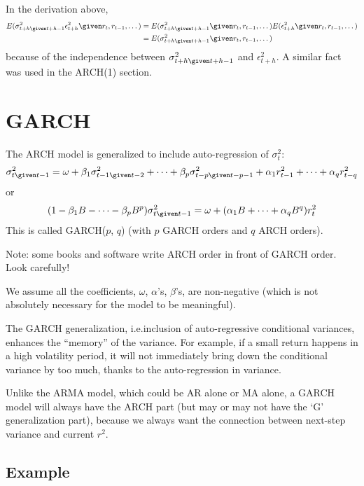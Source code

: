 \documentclass[12pt]{article}
\begin{document}
In the derivation above,
\[\begin{split}
E(\sigma^2_{t+h\given t+h-1} \epsilon^2_{t+h} \given r_t,r_{t-1},\dotsc)
&=
E(\sigma^2_{t+h\given t+h-1} \given r_t,r_{t-1},\dotsc)
    E(\epsilon^2_{t+h} \given r_t,r_{t-1},\dotsc)
\\
&=
E(\sigma^2_{t+h\given t+h-1} \given r_t,r_{t-1},\dotsc)
\end{split}
\]
because of the independence between
$\sigma^2_{t+h\given t+h-1}$ and $\epsilon^2_{t+h}$.
A similar fact was used in the ARCH(1) section.


\section{GARCH}

The ARCH model is generalized to include auto-regression of
$\sigma_t^2$:
\begin{equation}\label{eq:GARCH}
\sigma^2_{t\given t-1}
= \omega
    + \beta_1 \sigma^2_{t-1\given t-2}
    +\dotsb
    + \beta_p \sigma^2_{t-p\given t-p-1}
    + \alpha_1 r^2_{t-1}
    +\dotsb
    + \alpha_q r^2_{t-q}
\end{equation}
or
\begin{equation}\label{eq:GARCH-B}
(1 - \beta_1 B - \dotsb - \beta_p B^p) \sigma^2_{t\given t-1}
= \omega + (\alpha_1 B + \dotsb + \alpha_q B^q) r_t^2
\end{equation}
This is called
GARCH($p$, $q$)
(with $p$ GARCH orders and $q$ ARCH orders).

Note: some books and software write ARCH order in front of GARCH order.
Look carefully!

We assume all the coefficients,
$\omega$, $\alpha$'s, $\beta$'s, are non-negative
(which is not absolutely necessary for the model to be meaningful).


\alert
The GARCH generalization, i.e.\@ inclusion of auto-regressive
conditional variances, enhances the ``memory'' of the variance.
For example,
if a small return happens in a high volatility period,
it will not immediately bring down the conditional variance by too much,
thanks to the auto-regression in variance.

Unlike the ARMA model,
which could be AR alone or MA alone,
a GARCH model will always have the ARCH part
(but may or may not have the `G' generalization part),
because we always want the connection between next-step variance
and current $r^2$.

\subsection{Example}
\end{document}
